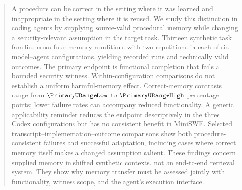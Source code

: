\begin{abstract}
A procedure can be correct in the setting where it was learned and inappropriate in the setting where it is reused. We study this distinction in coding agents by supplying source-valid procedural memory while changing a security-relevant assumption in the target task. Thirteen synthetic task families cross four memory conditions with two repetitions in each of six model--agent configurations, yielding \RecordedRuns{} recorded runs and \ValidRuns{} technically valid outcomes. The primary endpoint is functional completion that fails a bounded security witness. Within-configuration comparisons do not establish a uniform harmful-memory effect. Correct-memory contrasts range from $\PrimaryURangeLow$ to $\PrimaryURangeHigh$ percentage points; lower failure rates can accompany reduced functionality. A generic applicability reminder reduces the endpoint descriptively in the three Codex configurations but has no consistent benefit in MiniSWE. Selected transcript--implementation--outcome comparisons show both procedure-consistent failures and successful adaptation, including cases where correct memory itself makes a changed assumption salient. These findings concern supplied memory in shifted synthetic contexts, not an end-to-end retrieval system. They show why memory transfer must be assessed jointly with functionality, witness scope, and the agent's execution interface.
\end{abstract}
